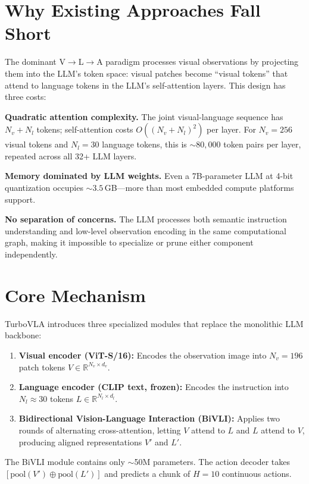 \documentclass[10pt,twocolumn]{article}
\begin{document}
\section{Why Existing Approaches Fall Short}

The dominant V$\to$L$\to$A paradigm processes visual observations by
projecting them into the LLM's token space: visual patches become
``visual tokens'' that attend to language tokens in the LLM's self-attention
layers. This design has three costs:

\textbf{Quadratic attention complexity.} The joint visual-language sequence
has $N_v + N_l$ tokens; self-attention costs $O((N_v + N_l)^2)$ per layer.
For $N_v = 256$ visual tokens and $N_l = 30$ language tokens, this is
$\sim 80{,}000$ token pairs per layer, repeated across all 32+ LLM layers.

\textbf{Memory dominated by LLM weights.} Even a 7B-parameter LLM at
4-bit quantization occupies $\sim 3.5$\,GB---more than most embedded
compute platforms support.

\textbf{No separation of concerns.} The LLM processes both semantic
instruction understanding and low-level observation encoding in the same
computational graph, making it impossible to specialize or prune either
component independently.

\section{Core Mechanism}

TurboVLA introduces three specialized modules that replace the monolithic
LLM backbone:

\begin{enumerate}[itemsep=1pt,parsep=0pt]
  \item \textbf{Visual encoder (ViT-S/16):} Encodes the observation image
    into $N_v = 196$ patch tokens $V \in \mathbb{R}^{N_v \times d_v}$.
  \item \textbf{Language encoder (CLIP text, frozen):} Encodes the
    instruction into $N_l \approx 30$ tokens $L \in \mathbb{R}^{N_l \times d_l}$.
  \item \textbf{Bidirectional Vision-Language Interaction (BiVLI):}
    Applies two rounds of alternating cross-attention, letting $V$ attend
    to $L$ and $L$ attend to $V$, producing aligned representations $V'$
    and $L'$.
\end{enumerate}

The BiVLI module contains only $\sim$50M parameters. The action decoder
takes $[\mathrm{pool}(V') \oplus \mathrm{pool}(L')]$ and predicts a
chunk of $H = 10$ continuous actions.
\end{document}
